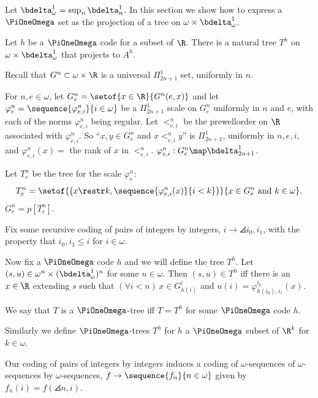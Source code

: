 \documentclass[oneside,12pt]{amsart}
\begin{document}
Let $\bdelta^1_{\omega} = \sup_n \bdelta^1_n$. In this section we show how to
express a $\PiOneOmega$ set as the projection
of a tree on $\omega\times \bdelta^1_{\omega}$.

\begin{definition}
Let $h$ be a $\PiOneOmega$ code for a subset of $\R$.
There is a natural tree $T^{h}$ on $\omega\times\bdelta^1_{\omega}$ that projects to $A^h$.

Recall that $G^n\subset\omega\times\R$ is a universal $\Pi^1_{2n+1}$ set, uniformly in $n$.

For $n,e\in\omega$, let $G^n_e = \setof{x\in\R}{G^n(e, x)}$ and
let $\varphi^n_e = \sequence{\varphi^n_{e,i}}{i\in\omega}$ be a $\Pi^1_{2n+1}$ scale on $G^n_e$ uniformly in $n$ and $e$,
with each of the norms $\varphi^n_{e,i}$ being regular.
Let $<^n_{e,i}$ be the prewellorder on $\R$ associated with $\varphi^n_{e,i}$. So ``$x,y\in G^n_e$ and $x <^n_{e,i} y$'' is
$\Pi^1_{2n+1}$, uniformly in $n,e,i$, and $\varphi^n_{e,i}(x) = $ the rank of $x$ in $<^n_{e,i}$.
$\varphi^n_{e,i} : G^n_e \map \bdelta^1_{2n+1}$.

Let $T^n_e$ be the tree for the scale $\varphi^n_e$:
$$T^n_e = \setof{\left(x\restr k,\sequence{\varphi^n_{e,i}(x)}{i<k}\right)}{x\in G^n_e \text{ and } k\in\omega}.$$
$G^n_e=p[T^n_e]$.

Fix some recursive coding of pairs of integers by integers, $i\to\angles{i_0,i_1}$,
with the property that $i_0,i_1\leq i$ for $i\in\omega$.

Now fix a $\PiOneOmega$ code $h$ and we will define the tree $T^h$.
Let $(s,u) \in \omega^n\times(\bdelta^1_{\omega})^n$ for some $n\in\omega$. Then $(s,u)\in T^h$ iff there is an
$x\in\R$ extending $s$ such that $(\forall i<n)\, x\in G^{i}_{h(i)}$ and
$u(i)=\varphi^{i_0}_{h(i_0),i_1}(x)$.

We say that $T$ is a $\PiOneOmega$-tree iff $T=T^h$ for some $\PiOneOmega$ code $h$.

Similarly we define $\PiOneOmega$-trees $T^h$ for $h$ a $\PiOneOmega$ subset of $\R^k$ for $k\in\omega$.
\end{definition}

Our coding of pairs of integers by integers induces a coding of $\omega$-sequences of $\omega$-sequences
by $\omega$-sequences, $f\to\sequence{f_n}{n\in\omega}$ given by $f_n(i) = f(\angles{n,i})$.
\end{document}
